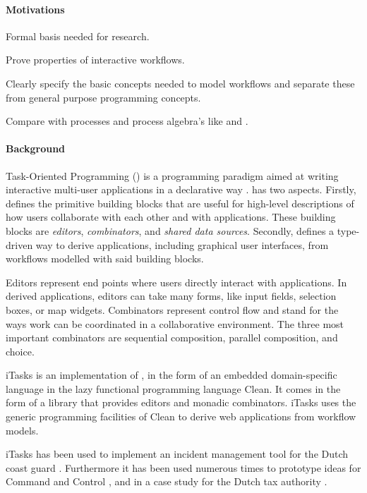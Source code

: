 \paragraph{Motivations}
\begin{itemize*}
  \item Formal basis needed for research.
  \item Prove properties of interactive workflows.
  \item Clearly specify the basic concepts needed to model workflows
    and separate these from general purpose programming concepts.
  \item Compare \TOP with processes and process algebra's like \CSP and \CCS.
\end{itemize*}


\paragraph{Background}
Task-Oriented Programming (\TOP) is a programming paradigm aimed at writing interactive multi-user applications in a declarative way \cite{conf/ppdp/PlasmeijerLMAK12}.
\TOP has two aspects.
Firstly, \TOP defines the primitive building blocks that are useful for high-level descriptions of how users collaborate with each other and with applications.
These building blocks are \emph{editors}, \emph{combinators}, and \emph{shared data sources}.
Secondly, \TOP defines a type-driven way to derive applications, including graphical user interfaces, from workflows modelled with said building blocks.

Editors represent end points where users directly interact with applications.
In derived applications, editors can take many forms, like input fields, selection boxes, or map widgets.
Combinators represent control flow and stand for the ways work can be coordinated in a collaborative environment.
The three most important combinators are sequential composition, parallel composition, and choice.

iTasks is an implementation of \TOP, in the form of an embedded domain-specific language in the lazy functional programming language Clean.
It comes in the form of a library that provides editors and monadic combinators.
iTasks uses the generic programming facilities of Clean to derive web applications from workflow models.

iTasks has been used to implement an incident management tool for the Dutch coast guard \cite{conf/iscram/LijnseJP12}.
Furthermore it has been used numerous times to prototype ideas for Command and Control \cite{theses/nlda/Kool17, theses/radboud/Stutterheim17}, and in a case study for the Dutch tax authority \cite{conf/sfp/StutterheimAP17}.

